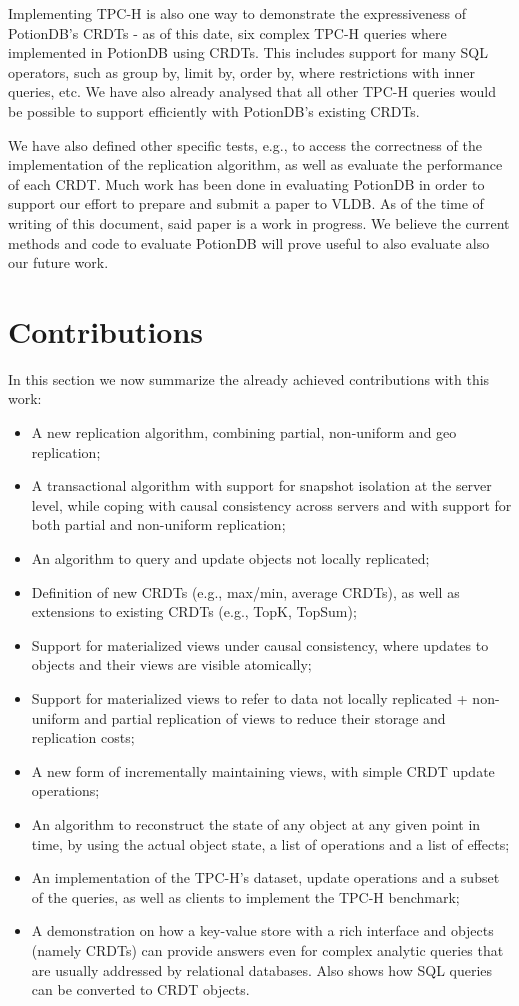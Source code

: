 Implementing TPC-H is also one way to demonstrate the expressiveness of PotionDB's CRDTs - as of this date, six complex TPC-H queries where implemented in PotionDB using CRDTs.
This includes support for many SQL operators, such as group by, limit by, order by, where restrictions with inner queries, etc.
We have also already analysed that all other TPC-H queries would be possible to support efficiently with PotionDB's existing CRDTs.

We have also defined other specific tests, e.g., to access the correctness of the implementation of the replication algorithm, as well as evaluate the performance of each CRDT.
Much work has been done in evaluating PotionDB in order to support our effort to prepare and submit a paper to VLDB.
As of the time of writing of this document, said paper is a work in progress.
We believe the current methods and code to evaluate PotionDB will prove useful to also evaluate also our future work.

\section{Contributions}
\label{sec:contributions}

In this section we now summarize the already achieved contributions with this work:

\begin{itemize}
	\item A new replication algorithm, combining partial, non-uniform and geo replication;
	\item A transactional algorithm with support for snapshot isolation at the server level, while coping with causal consistency across servers and with support for both partial and non-uniform replication;
	\item An algorithm to query and update objects not locally replicated;
	\item Definition of new CRDTs (e.g., max/min, average CRDTs), as well as extensions to existing CRDTs (e.g., TopK, TopSum);
	\item Support for materialized views under causal consistency, where updates to objects and their views are visible atomically;
	\item Support for materialized views to refer to data not locally replicated + non-uniform and partial replication of views to reduce their storage and replication costs;
	\item A new form of incrementally maintaining views, with simple CRDT update operations;
	\item An algorithm to reconstruct the state of any object at any given point in time, by using the actual object state, a list of operations and a list of effects;
	\item An implementation of the TPC-H's dataset, update operations and a subset of the queries, as well as clients to implement the TPC-H benchmark;
	\item A demonstration on how a key-value store with a rich interface and objects (namely CRDTs) can provide answers even for complex analytic queries that are usually addressed by relational databases. Also shows how SQL queries can be converted to CRDT objects.
\end{itemize}

